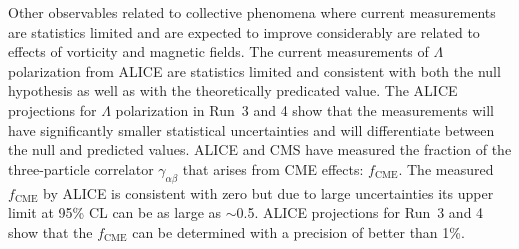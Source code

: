 Other observables related to collective phenomena where current 
  measurements are statistics limited and are expected to improve 
  considerably are related to effects of vorticity and magnetic fields.
%
The current measurements of $\Lambda$ polarization from ALICE are statistics limited
  and consistent with both the null hypothesis as well as with the theoretically
  predicated value.
The ALICE projections for $\Lambda$ polarization in Run~3 and 4 show that 
  the measurements will have significantly smaller statistical uncertainties 
  and will differentiate between the null and predicted values. 
%
ALICE and CMS have measured the fraction of the three-particle correlator
  $\gamma_{\alpha\beta}$ that arises from CME effects: $f_{\mathrm{CME}}$.
The measured $f_{\mathrm{CME}}$ by ALICE is consistent with zero but due to 
  large uncertainties its upper limit at 95\% CL can be as large as $\sim$0.5.
ALICE projections for Run~3 and 4 show that the $f_{\mathrm{CME}}$ can 
  be determined with a precision of better than 1\%.


















